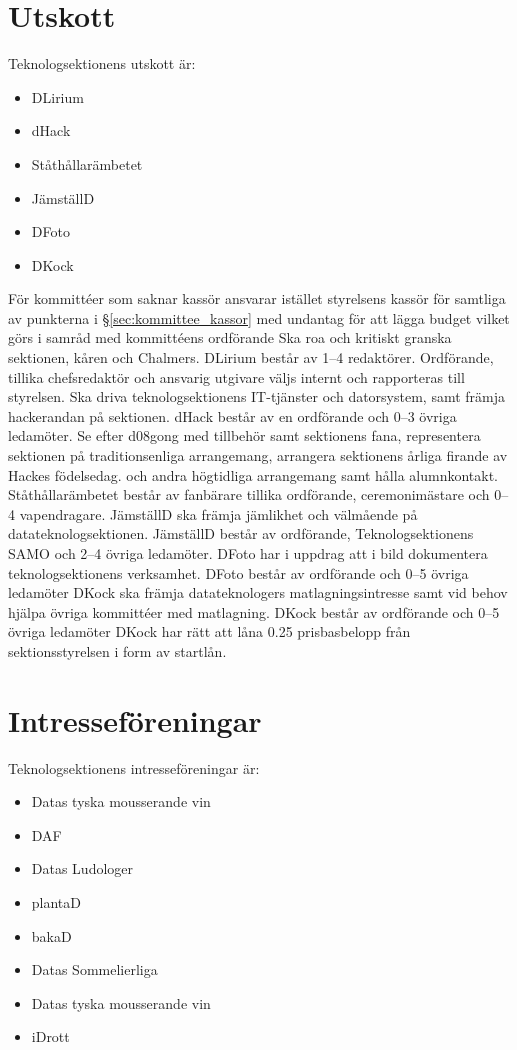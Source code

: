 \documentclass[a4paper]{dtek}
\newcommand{\prisbasbelopp}[1]{
    #1 prisbasbelopp
    \ifdef{\nuvarandeprisbasbelopp}{
        \marginpar{
            \small{ \textbf{\roundandprint{\xintiexpr#1 * \nuvarandeprisbasbelopp\relax}kr}}
        }
    }{}
}
\begin{document}
\section{Utskott}
\para Teknologsektionens utskott är:
\begin{itemize}
  \item DLirium
  \item dHack
  \item Ståthållarämbetet
  \item JämställD
  \item DFoto
  \item DKock
\end{itemize}
\para För kommittéer som saknar kassör ansvarar istället styrelsens kassör för samtliga av punkterna i \S\ref{sec:kommittee_kassor} med undantag för att lägga budget vilket görs i samråd med kommittéens ordförande
\para[DLirium] Ska roa och kritiskt granska sektionen, kåren och Chalmers.
\para DLirium består av 1–4 redaktörer. Ordförande, tillika chefsredaktör och ansvarig utgivare väljs internt och rapporteras till styrelsen.
\para[dHack] Ska driva teknologsektionens IT-tjänster och datorsystem, samt främja hackerandan på sektionen.
\para dHack består av en ordförande och 0–3 övriga ledamöter.
\para[Ståthållarämbetet] Se efter d08gong med tillbehör samt sektionens fana, representera sektionen på traditionsenliga arrangemang, arrangera sektionens årliga firande av Hackes födelsedag. och andra högtidliga arrangemang samt hålla alumnkontakt.
\para Ståthållarämbetet består av fanbärare tillika ordförande, ceremonimästare och 0–4 vapendragare.
\para[JämställD] JämställD ska främja jämlikhet och välmående på datateknologsektionen.
\para JämställD består av ordförande, Teknologsektionens SAMO och 2–4 övriga ledamöter.
\para[DFoto] DFoto har i uppdrag att i bild dokumentera teknologsektionens verksamhet.
\para DFoto består av ordförande och 0–5 övriga ledamöter
\para[DKock] DKock ska främja datateknologers matlagningsintresse samt vid behov hjälpa övriga kommittéer med matlagning.
\para DKock består av ordförande och 0–5 övriga ledamöter
\para DKock har rätt att låna \prisbasbelopp{0.25} från sektionsstyrelsen i form av startlån.
\section{Intresseföreningar}
Teknologsektionens intresseföreningar är:
\begin{itemize}
  \item Datas tyska mousserande vin
  \item DAF
  \item Datas Ludologer
  \item plantaD
  \item bakaD
  \item Datas Sommelierliga
  \item Datas tyska mousserande vin
  \item iDrott
\end{itemize}
\end{document}
